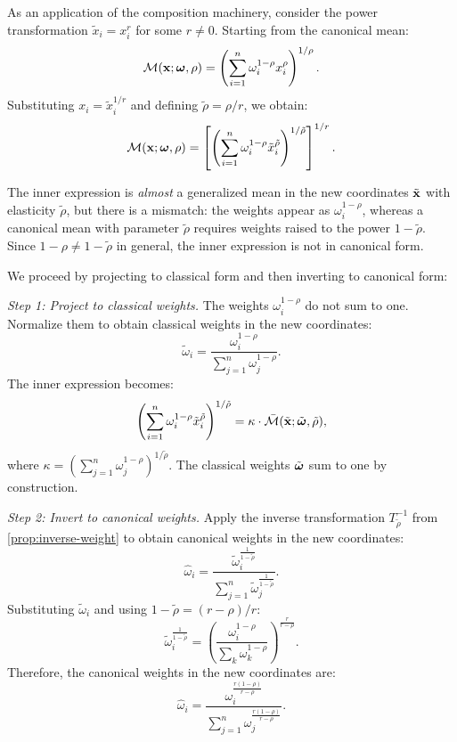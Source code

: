 As an application of the composition machinery, consider the power transformation $\tilde{x}_i = x_i^r$ for some $r \neq 0$. Starting from the canonical mean:
\[
\mathcal{M}(\mathbf{x}; \boldsymbol{\omega}, \rho) = \left( \sum_{i=1}^{n} \omega_i^{1-\rho} x_i^\rho \right)^{1/\rho}.
\]
Substituting $x_i = \tilde{x}_i^{1/r}$ and defining $\tilde{\rho} = \rho/r$, we obtain:
\[
\mathcal{M}(\mathbf{x}; \boldsymbol{\omega}, \rho) = \left[ \left( \sum_{i=1}^{n} \omega_i^{1-\rho} \tilde{x}_i^{\tilde{\rho}} \right)^{1/\tilde{\rho}} \right]^{1/r}.
\]

The inner expression is \emph{almost} a generalized mean in the new coordinates $\tilde{\mathbf{x}}$ with elasticity $\tilde{\rho}$, but there is a mismatch: the weights appear as $\omega_i^{1-\rho}$, whereas a canonical mean with parameter $\tilde{\rho}$ requires weights raised to the power $1-\tilde{\rho}$. Since $1-\rho \neq 1-\tilde{\rho}$ in general, the inner expression is not in canonical form.

We proceed by projecting to classical form and then inverting to canonical form:

\textit{Step 1: Project to classical weights.} The weights $\omega_i^{1-\rho}$ do not sum to one. Normalize them to obtain classical weights in the new coordinates:
\[
\tilde{\omega}_i = \frac{\omega_i^{1-\rho}}{\sum_{j=1}^{n} \omega_j^{1-\rho}}.
\]
The inner expression becomes:
\[
\left( \sum_{i=1}^{n} \omega_i^{1-\rho} \tilde{x}_i^{\tilde{\rho}} \right)^{1/\tilde{\rho}} = \kappa \cdot \bar{\mathcal{M}}(\tilde{\mathbf{x}}; \tilde{\boldsymbol{\omega}}, \tilde{\rho}),
\]
where $\kappa = \left( \sum_{j=1}^{n} \omega_j^{1-\rho} \right)^{1/\tilde{\rho}}$. The classical weights $\tilde{\boldsymbol{\omega}}$ sum to one by construction.

\textit{Step 2: Invert to canonical weights.} Apply the inverse transformation $T_{\tilde{\rho}}^{-1}$ from \cref{prop:inverse-weight} to obtain canonical weights in the new coordinates:
\[
\hat{\omega}_i = \frac{\tilde{\omega}_i^{\frac{1}{1-\tilde{\rho}}}}{\sum_{j=1}^{n} \tilde{\omega}_j^{\frac{1}{1-\tilde{\rho}}}}.
\]
Substituting $\tilde{\omega}_i$ and using $1-\tilde{\rho} = (r-\rho)/r$:
\[
\tilde{\omega}_i^{\frac{1}{1-\tilde{\rho}}} = \left( \frac{\omega_i^{1-\rho}}{\sum_k \omega_k^{1-\rho}} \right)^{\frac{r}{r-\rho}}.
\]
Therefore, the canonical weights in the new coordinates are:
\begin{equation}
\label{eq:coord-change-weights}
\hat{\omega}_i = \frac{\omega_i^{\frac{r(1-\rho)}{r-\rho}}}{\sum_{j=1}^{n} \omega_j^{\frac{r(1-\rho)}{r-\rho}}}.
\end{equation}

